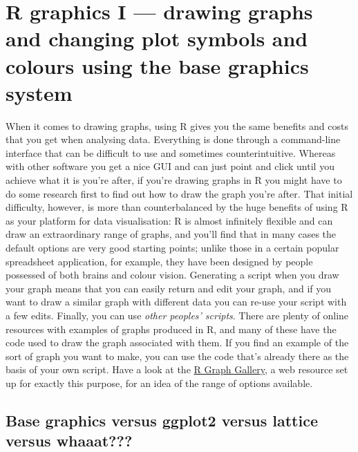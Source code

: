 \documentclass[
]{book}
\begin{document}
\hypertarget{r-graphics-i-drawing-graphs-and-changing-plot-symbols-and-colours-using-the-base-graphics-system}{%
\chapter{R graphics I --- drawing graphs and changing plot symbols and colours using the base graphics system}\label{r-graphics-i-drawing-graphs-and-changing-plot-symbols-and-colours-using-the-base-graphics-system}}

When it comes to drawing graphs, using R gives you the same benefits and costs that you get when analysing data. Everything is done through a command-line interface that can be difficult to use and sometimes counterintuitive. Whereas with other software you get a nice GUI and can just point and click until you achieve what it is you're after, if you're drawing graphs in R you might have to do some research first to find out how to draw the graph you're after. That initial difficulty, however, is more than counterbalanced by the huge benefits of using R as your platform for data visualisation: R is almost infinitely flexible and can draw an extraordinary range of graphs, and you'll find that in many cases the default options are very good starting points; unlike those in a certain popular spreadsheet application, for example, they have been designed by people possessed of both brains and colour vision. Generating a script when you draw your graph means that you can easily return and edit your graph, and if you want to draw a similar graph with different data you can re-use your script with a few edits. Finally, you can use \emph{other peoples' scripts}. There are plenty of online resources with examples of graphs produced in R, and many of these have the code used to draw the graph associated with them. If you find an example of the sort of graph you want to make, you can use the code that's already there as the basis of your own script. Have a look at the \href{https://www.r-graph-gallery.com/}{R Graph Gallery}, a web resource set up for exactly this purpose, for an idea of the range of options available.

\hypertarget{base-graphics-versus-ggplot2-versus-lattice-versus-whaaat}{%
\section{Base graphics versus ggplot2 versus lattice versus whaaat???}\label{base-graphics-versus-ggplot2-versus-lattice-versus-whaaat}}
\end{document}
